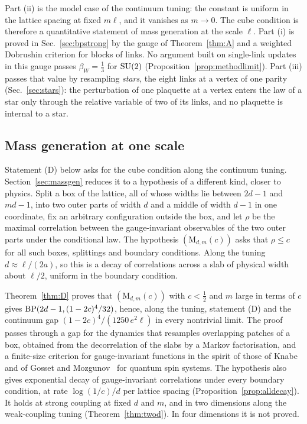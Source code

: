 Part (ii) is the model case of the continuum tuning: the constant is uniform
in the lattice spacing at fixed $m\ell$, and it vanishes as $m\to0$. The cube
condition is therefore a quantitative statement of mass generation at the
scale $\ell$. Part (i) is proved in Sec.~\ref{sec:bpstrong} by the gauge of
Theorem~\ref{thm:A} and a weighted Dobrushin criterion for blocks of links.
No argument built on single-link updates in this gauge passes
$\beta_W=\frac13$ for $\mathrm{SU}(2)$ (Proposition~\ref{prop:methodlimit}). Part
(iii) passes that value by resampling \emph{stars}, the eight links at a
vertex of one parity (Sec.~\ref{sec:stars}): the perturbation of one
plaquette at a vertex enters the law of a star only through the relative
variable of two of its links, and no plaquette is internal to a star.

\subsection{Mass generation at one scale}

Statement (D) below asks for the cube condition along the continuum tuning.
Section~\ref{sec:massgen} reduces it to a hypothesis of a different kind,
closer to physics. Split a box of the lattice, all of whose widths lie
between $2d-1$ and $md-1$, into two outer parts of width $d$ and a middle of
width $d-1$ in one coordinate, fix an arbitrary configuration outside the
box, and let $\rho$ be the maximal correlation between the gauge-invariant
observables of the two outer parts under the conditional law. The hypothesis
$(\mathrm M_{d,m}(c))$ asks that $\rho\le c$ for all such boxes, splittings
and boundary conditions. Along the tuning $d\approx\ell/(2a)$, so this is a
decay of correlations across a slab of physical width about $\ell/2$,
uniform in the boundary condition.

Theorem~\ref{thm:D} proves that $(\mathrm M_{d,m}(c))$ with $c<\frac12$ and $m$
large in terms of $c$ gives $\mathrm{BP}(2d-1,(1-2c)^4/32)$, hence, along the tuning,
statement (D) and the continuum gap $(1-2c)^4/(1250\,e^2\ell)$ in every
nontrivial limit. The proof passes through a gap for the dynamics that
resamples overlapping patches of a box, obtained from the decorrelation of
the slabs by a Markov factorisation, and a finite-size criterion for
gauge-invariant functions in the spirit of those of Knabe~\cite{Kna88} and of
Gosset and Mozgunov~\cite{GM16} for quantum spin systems. The hypothesis also
gives exponential decay of gauge-invariant correlations under every boundary
condition, at rate $\log(1/c)/d$ per lattice spacing
(Proposition~\ref{prop:alldecay}). It holds at strong coupling at fixed $d$ and
$m$, and in two dimensions along the weak-coupling tuning
(Theorem~\ref{thm:twod}). In four dimensions it is not proved.

